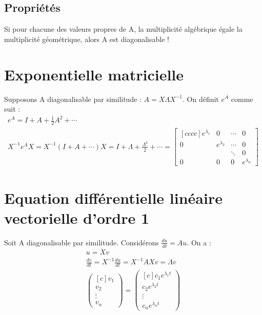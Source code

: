 \documentclass[a4paper]{book}
\begin{document}
\subsection{Propriétés}
\begin{framed}
    Si pour chacune des valeurs propres de A, la multiplicité algébrique égale la multiplicité géométrique, alors A est diagonalisable !
\end{framed}
\section{Exponentielle matricielle}
Supposons A diagonalisable par similitude : $A = X\Lambda X^{-1}$. On définit $e^A$ comme suit :
\begin{gather}
    e^A = I + A + \frac{1}{2}A^2+\cdots \\
    X^{-1}e^AX = X^{-1}(I+A+\cdots)X=I+\Lambda + \frac{\Lambda^2}{2}+\cdots = \begin{bmatrix}[cccc]
    e^{\lambda_1} &0&\cdots&0 \\
    0&e^{\lambda_2} & \cdots&0 \\
    &&\ddots&0 \\
    0&0&0&e^{\lambda_n}
    \end{bmatrix}
\end{gather}
\section{Equation différentielle linéaire vectorielle d'ordre 1}
Soit A diagonalisable par similitude. Considérons $\frac{du}{dt} = Au$. On a :
\begin{gather}
    u = Xv \\
    \frac{dv}{dt} = X^{-1}\frac{du}{dt} = X^{-1}AXv = \Lambda v \\
    \begin{pmatrix}[c]
    v_1 \\ v_2 \\ \vdots \\ v_n
    \end{pmatrix} = \begin{pmatrix}[c]
    c_1e^{\lambda_1t} \\
    c_2e^{\lambda_2t} \\
    \vdots \\
    c_ne^{\lambda_nt}
    \end{pmatrix}
\end{gather}
\end{document}
